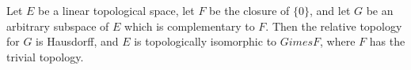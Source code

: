 Let $E$ be a linear topological space, let $F$ be the closure of $\{0\}$, and let $G$ be an arbitrary subspace of $E$ which is complementary to $F$. Then the relative topology for $G$ is Hausdorff, and $E$ is topologically isomorphic to $G 	imes F$, where $F$ has the trivial topology.
